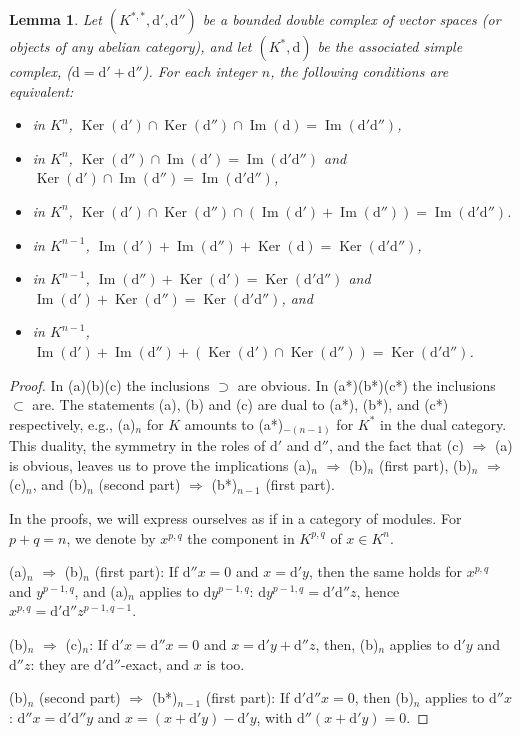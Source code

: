 \documentclass[11pt]{amsart}
\theoremstyle{plain}
\newtheorem{lemma}[theorem]{Lemma}
\theoremstyle{definition}
\DeclareMathOperator{\Ker}{Ker}
\DeclareMathOperator{\Imop}{Im}
\newcommand{\dd}{\mathrm{d}}
\begin{document}
\begin{lemma}\label{lem:5.15}
Let $(K^{*,*}, \dd', \dd'')$ be a bounded double complex of vector spaces (or objects of any abelian category), and let $(K^{*}, \dd)$ be the associated simple complex, ($\dd = \dd' + \dd''$). For each integer $n$, the following conditions are equivalent:
\begin{itemize}
\item[(a)$_{n}$] in $K^{n}$, $\Ker(\dd') \cap \Ker(\dd'') \cap \Imop(\dd) = \Imop(\dd'\dd'')$,
\item[(b)$_{n}$] in $K^{n}$, $\Ker(\dd'') \cap \Imop(\dd') = \Imop(\dd'\dd'')$ and $\Ker(\dd') \cap \Imop(\dd'') = \Imop(\dd'\dd'')$,
\item[(c)$_{n}$] in $K^{n}$, $\Ker(\dd') \cap \Ker(\dd'') \cap (\Imop(\dd') + \Imop(\dd'')) = \Imop(\dd'\dd'')$.
\item[(a*)$_{n-1}$] in $K^{n-1}$, $\Imop(\dd') + \Imop(\dd'') + \Ker(\dd) = \Ker(\dd'\dd'')$,
\item[(b*)$_{n-1}$] in $K^{n-1}$, $\Imop(\dd'') + \Ker(\dd') = \Ker(\dd'\dd'')$ and $\Imop(\dd') + \Ker(\dd'') = \Ker(\dd'\dd'')$, and
\item[(c*)$_{n-1}$] in $K^{n-1}$, $\Imop(\dd') + \Imop(\dd'') + (\Ker(\dd') \cap \Ker(\dd'')) = \Ker(\dd'\dd'')$.
\end{itemize}
\end{lemma}

\begin{proof}
In (a)(b)(c) the inclusions $\supset$ are obvious. In (a*)(b*)(c*) the inclusions $\subset$ are. The statements (a), (b) and (c) are dual to (a*), (b*), and (c*) respectively, e.g., (a)$_{n}$ for $K$ amounts to (a*)$_{-(n-1)}$ for $K^{*}$ in the dual category. This duality, the symmetry in the roles of $\dd'$ and $\dd''$, and the fact that (c) $\Rightarrow$ (a) is obvious, leaves us to prove the implications (a)$_{n}$ $\Rightarrow$ (b)$_{n}$ (first part), (b)$_{n}$ $\Rightarrow$ (c)$_{n}$, and (b)$_{n}$ (second part) $\Rightarrow$ (b*)$_{n-1}$ (first part).

In the proofs, we will express ourselves as if in a category of modules. For $p+q = n$, we denote by $x^{p,q}$ the component in $K^{p,q}$ of $x \in K^{n}$.

(a)$_{n}$ $\Rightarrow$ (b)$_{n}$ (first part): If $\dd'' x = 0$ and $x = \dd' y$, then the same holds for $x^{p,q}$ and $y^{p-1,q}$, and (a)$_{n}$ applies to $\dd y^{p-1,q}$: $\dd y^{p-1,q} = \dd'\dd'' z$, hence $x^{p,q} = \dd'\dd'' z^{p-1,q-1}$.

(b)$_{n}$ $\Rightarrow$ (c)$_{n}$: If $\dd' x = \dd'' x = 0$ and $x = \dd' y + \dd'' z$, then, (b)$_{n}$ applies to $\dd' y$ and $\dd'' z$: they are $\dd'\dd''$-exact, and $x$ is too.

(b)$_{n}$ (second part) $\Rightarrow$ (b*)$_{n-1}$ (first part): If $\dd'\dd'' x = 0$, then (b)$_{n}$ applies to $\dd'' x$: $\dd'' x = \dd'\dd'' y$ and $x = (x + \dd' y) - \dd' y$, with $\dd''(x + \dd' y) = 0$.
\end{proof}
\end{document}
